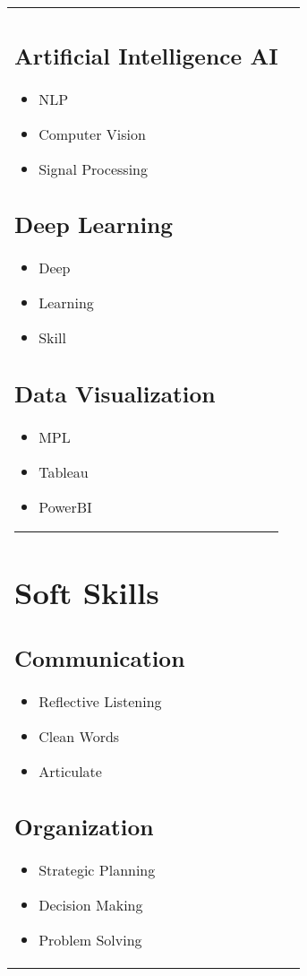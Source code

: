 \documentclass{article}
\begin{document}
\begin{tabular*}{7.5in}{ l | l}
\begin{minipage}[t]{2.0in}
		\subsection*{Artificial Intelligence AI}
	\begin{itemize}[noitemsep]
		\item NLP
		\item Computer Vision
		\item Signal Processing
	\end{itemize}
	\subsection*{Deep Learning}
	\begin{itemize}[noitemsep]
		\item Deep
		\item Learning 
		\item Skill
	\end{itemize}
	\subsection*{Data Visualization}
	\begin{itemize}[noitemsep]
		\item MPL 
		\item Tableau 
		\item PowerBI 
	\end{itemize}
	\hrule

	\section*{Soft Skills}
	\subsection*{Communication}
	\begin{itemize}[noitemsep]
		\item Reflective Listening
		\item Clean Words
		\item Articulate
	\end{itemize}
	\subsection*{Organization}
	\begin{itemize}[noitemsep]
		\item Strategic Planning
		\item Decision Making
		\item Problem Solving
	\end{itemize}

\end{minipage}
\end{tabular*}
\end{document}
